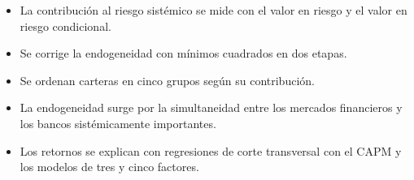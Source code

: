 \documentclass{article}
\newcommand{\cardtitlesize}{\fontsize{34.2}{41.0}\selectfont}
\newcommand{\cardtitle}[2][navy]{{\color{#1}\cardtitlesize\bfseries\textls[110]{\MakeUppercase{#2}}}\par\vspace{7mm}}
\begin{document}
\vfill
\hspace*{34mm}\begin{minipage}{773mm}
\begin{tcolorbox}[card]\cardtitle{Metodología}
\begin{minipage}[t]{0.48\linewidth}
\begin{itemize}
\item La contribución al riesgo sistémico se mide con el valor en riesgo y el valor en riesgo condicional.
\item Se corrige la endogeneidad con mínimos cuadrados en dos etapas.
\item Se ordenan carteras en cinco grupos según su contribución.
\end{itemize}
\end{minipage}\hfill
\begin{minipage}[t]{0.48\linewidth}
\begin{itemize}
\item La endogeneidad surge por la simultaneidad entre los mercados financieros y los bancos sistémicamente importantes.
\item Los retornos se explican con regresiones de corte transversal con el CAPM y los modelos de tres y cinco factores.
\end{itemize}
\end{minipage}
\end{tcolorbox}
\end{minipage}
\end{document}
